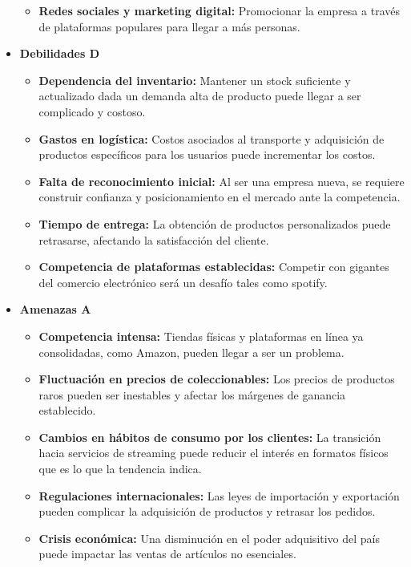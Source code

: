 \documentclass[12pt]{article}
\begin{document}
\begin{itemize}
\begin{itemize}
		\item \textbf{Redes sociales y marketing digital:} Promocionar la empresa a través de plataformas populares para llegar a más personas.

	\end{itemize}

	\item \textbf{Debilidades D}

	\begin{itemize}
		\item \textbf{Dependencia del inventario:} Mantener un stock suficiente y actualizado dada un demanda alta de producto puede llegar a ser complicado y costoso.
		
		\item \textbf{Gastos en logística:} Costos asociados al transporte y adquisición de productos específicos para los usuarios puede incrementar los costos.
		
		\item \textbf{Falta de reconocimiento inicial:} Al ser una empresa nueva, se requiere construir confianza y posicionamiento en el mercado ante la competencia.
		
		\item \textbf{Tiempo de entrega:} La obtención de productos personalizados puede retrasarse, afectando la satisfacción del cliente.
		
		\item \textbf{Competencia de plataformas establecidas:} Competir con gigantes del comercio electrónico será un desafío tales como spotify.

	\end{itemize}

	\item \textbf{Amenazas A}

	\begin{itemize}
		\item \textbf{Competencia intensa:} Tiendas físicas y plataformas en línea ya consolidadas, como Amazon, pueden llegar a ser un problema.
		
		\item \textbf{Fluctuación en precios de coleccionables:} Los precios de productos raros pueden ser inestables y afectar los márgenes de ganancia establecido.
		
		\item \textbf{Cambios en hábitos de consumo por los clientes:} La transición hacia servicios de streaming puede reducir el interés en formatos físicos que es lo que la tendencia indica.
		
		\item \textbf{Regulaciones internacionales:} Las leyes de importación y exportación pueden complicar la adquisición de productos y retrasar los pedidos.
		
		\item \textbf{Crisis económica:} Una disminución en el poder adquisitivo del país puede impactar las ventas de artículos no esenciales.

	\end{itemize}

\end{itemize}
\end{document}

